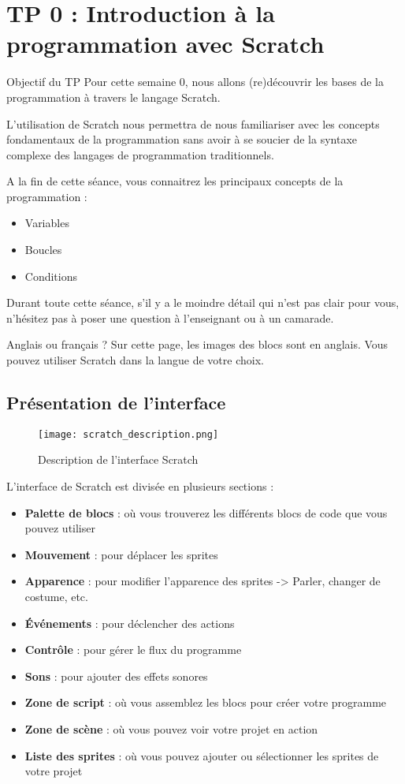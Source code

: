 \section{TP 0 : Introduction à la programmation avec Scratch}


\begin{UPSTIinfor}{Objectif du TP}
Pour cette semaine 0, nous allons (re)découvrir les bases de la programmation à travers le langage Scratch. 

L'utilisation de Scratch nous permettra de nous familiariser avec les concepts fondamentaux de la programmation sans avoir à se soucier de la syntaxe complexe des langages de programmation traditionnels.

A la fin de cette séance, vous connaitrez les principaux concepts de la programmation :
\begin{itemize}
\item Variables
\item Boucles
\item Conditions
\end{itemize}
Durant toute cette séance, s'il y a le moindre détail qui n'est pas clair pour vous, n'hésitez pas à poser une question à l'enseignant ou à un camarade.
\end{UPSTIinfor}

\begin{UPSTIwarning}{Anglais ou français ?}
Sur cette page, les images des blocs sont en anglais. Vous pouvez utiliser Scratch dans la langue de votre choix.
\end{UPSTIwarning}


\subsection{Présentation de l'interface}

\begin{figure}[h]
\centering
\texttt{[image: scratch\_description.png]}
\caption{Description de l'interface Scratch}
\end{figure}

L'interface de Scratch est divisée en plusieurs sections :
\begin{itemize}
\item \textbf{Palette de blocs} : où vous trouverez les différents blocs de code que vous pouvez utiliser
\item \textbf{Mouvement} : pour déplacer les sprites
\item \textbf{Apparence} : pour modifier l'apparence des sprites -> Parler, changer de costume, etc.
\item \textbf{Événements} : pour déclencher des actions
\item \textbf{Contrôle} : pour gérer le flux du programme
\item \textbf{Sons} : pour ajouter des effets sonores
\item \textbf{Zone de script} : où vous assemblez les blocs pour créer votre programme
\item \textbf{Zone de scène} : où vous pouvez voir votre projet en action
\item \textbf{Liste des sprites} : où vous pouvez ajouter ou sélectionner les sprites de votre projet
\end{itemize}
